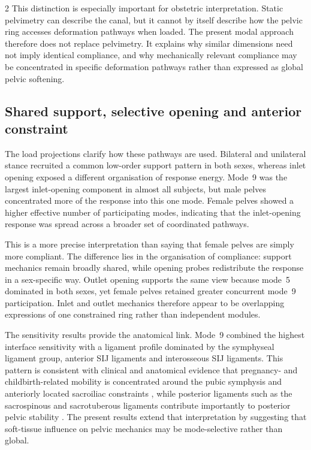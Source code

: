 \documentclass[openacc]{rsproca_new}
\begin{document}
\begin{multicols}{2}
This distinction is especially important for obstetric interpretation. Static pelvimetry can describe the canal, but it cannot by itself describe how the pelvic ring accesses deformation pathways when loaded. The present modal approach therefore does not replace pelvimetry. It explains why similar dimensions need not imply identical compliance, and why mechanically relevant compliance may be concentrated in specific deformation pathways rather than expressed as global pelvic softening.

\subsection{Shared support, selective opening and anterior constraint}

The load projections clarify how these pathways are used. Bilateral and unilateral stance recruited a common low-order support pattern in both sexes, whereas inlet opening exposed a different organisation of response energy. Mode~9 was the largest inlet-opening component in almost all subjects, but male pelves concentrated more of the response into this one mode. Female pelves showed a higher effective number of participating modes, indicating that the inlet-opening response was spread across a broader set of coordinated pathways.

This is a more precise interpretation than saying that female pelves are simply more compliant. The difference lies in the organisation of compliance: support mechanics remain broadly shared, while opening probes redistribute the response in a sex-specific way. Outlet opening supports the same view because mode~5 dominated in both sexes, yet female pelves retained greater concurrent mode~9 participation. Inlet and outlet mechanics therefore appear to be overlapping expressions of one constrained ring rather than independent modules.

The sensitivity results provide the anatomical link. Mode~9 combined the highest interface sensitivity with a ligament profile dominated by the symphyseal ligament group, anterior SIJ ligaments and interosseous SIJ ligaments. This pattern is consistent with clinical and anatomical evidence that pregnancy- and childbirth-related mobility is concentrated around the pubic symphysis and anteriorly located sacroiliac constraints \cite{Damen2001,Pires2015,Cicek2015,Fiani2021}, while posterior ligaments such as the sacrospinous and sacrotuberous ligaments contribute importantly to posterior pelvic stability \cite{Hammer2019,Aldabe2019}. The present results extend that interpretation by suggesting that soft-tissue influence on pelvic mechanics may be mode-selective rather than global.


\end{multicols}
\end{document}
